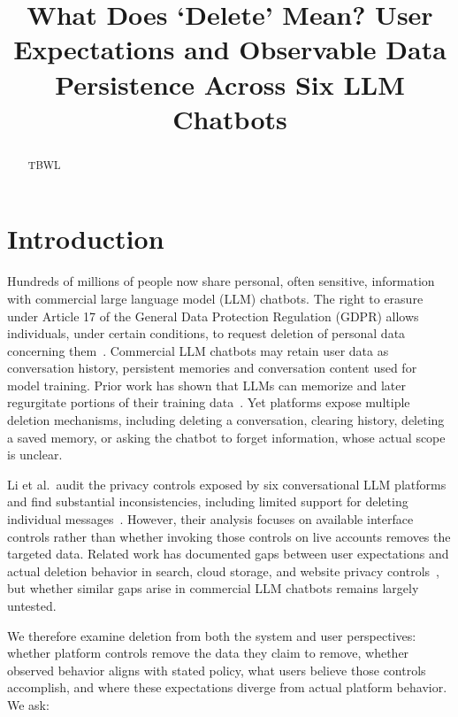\documentclass[conference,compsoc]{IEEEtran}
\title{What Does `Delete' Mean? User Expectations and Observable Data Persistence Across Six LLM Chatbots}
\author{\IEEEauthorblockN{Anonymous Author(s)}
\IEEEauthorblockA{Submission \#XXX}}
\begin{document}
\maketitle

\begin{abstract}
TBWL
\end{abstract}

\section{Introduction}
\label{sec:intro}

Hundreds of millions of people now share personal, often sensitive,
information with commercial large language model (LLM) chatbots. The
right to erasure under Article 17 of the General Data Protection
Regulation (GDPR) allows individuals, under certain conditions, to
request deletion of personal data concerning them~\cite{gdpr2016}.
Commercial LLM chatbots may retain user data as conversation history,
persistent memories and conversation content used for model
training. Prior work has shown that LLMs can memorize and later
regurgitate portions of their training data~\cite{carlini2021extracting}.
Yet platforms expose multiple deletion mechanisms, including deleting a
conversation, clearing history, deleting a saved memory, or asking the
chatbot to forget information, whose actual scope is unclear.

Li et al.\ audit the privacy controls exposed by six conversational LLM
platforms and find substantial inconsistencies, including limited support
for deleting individual messages~\cite{li2026privacy}. However, their
analysis focuses on available interface controls rather than whether
invoking those controls on live accounts removes the targeted data.
Related work has documented gaps between user expectations and actual
deletion behavior in search, cloud storage, and website privacy
controls~\cite{bertram2019five,kang2015mydata,ramokapane2017stupid,habib2019empirical},
but whether similar gaps arise in commercial LLM chatbots remains largely
untested.

We therefore examine deletion from both the system and user perspectives:
whether platform controls remove the data they claim to remove, whether
observed behavior aligns with stated policy, what users believe those
controls accomplish, and where these expectations diverge from actual
platform behavior. We ask:
\end{document}

